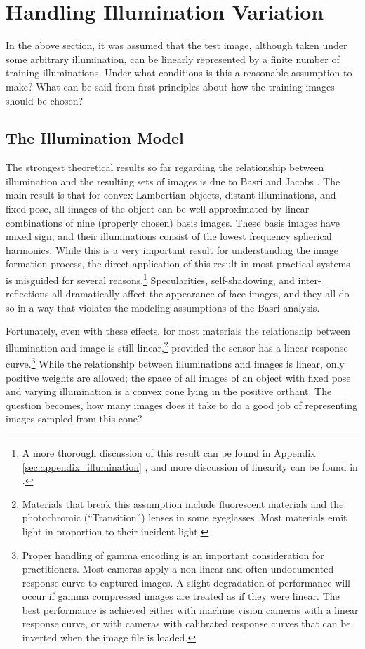 \section{Handling Illumination Variation}
\label{sec:illumination}
In the above section, it was assumed that the test image, although taken under
some arbitrary illumination, can be linearly represented by a finite number of
training illuminations.  Under what conditions is this a reasonable assumption
to make?  What can be said from first principles about how the training images
should be chosen?

\subsection{The Illumination Model}
%
The strongest theoretical results so far regarding the relationship between
illumination and the resulting sets of images is due to Basri and Jacobs
\cite{Basri2003-PAMI}.  The main result is that for convex Lambertian objects,
distant illuminations, and fixed pose, all images of the object can be well
approximated by linear combinations of nine (properly chosen) basis images.
These basis images have mixed sign, and their illuminations consist of the
lowest frequency spherical harmonics.  While this is a very important result
for understanding the image formation process, the direct application of this
result in most practical systems is misguided for several reasons.\footnote{A more
thorough discussion of this result can be found in 
Appendix \ref{sec:appendix_illumination}
, and more discussion of linearity can be found in
\cite{belhumeur1998set}.}
Specularities, self-shadowing, and
inter-reflections all dramatically affect the appearance of face images, and
they all do so in a way that violates the modeling assumptions of the Basri
analysis.

Fortunately, even with these effects, for most materials the relationship
between illumination and image is still linear,\footnote{Materials that break
this assumption include fluorescent materials and the photochromic
(``Transition'') lenses in some eyeglasses.  Most materials emit light in
proportion to their incident light.} provided the sensor has a linear response
curve.\footnote{Proper handling of gamma encoding is an important consideration
for practitioners.  Most cameras apply a non-linear and often undocumented
response curve to captured images.  A slight degradation of performance will
occur if gamma compressed images are treated as if they were linear.  The best
performance is achieved either with machine vision cameras with a linear
response curve, or with cameras with calibrated response curves that can be
inverted when the image file is loaded.} While the relationship between
illuminations and images is linear, only positive weights are allowed; the
space of all images of an object with fixed pose and varying illumination is a
convex cone lying in the positive orthant. The question becomes, how many
images does it take to do a good job of representing images sampled from this
cone?

